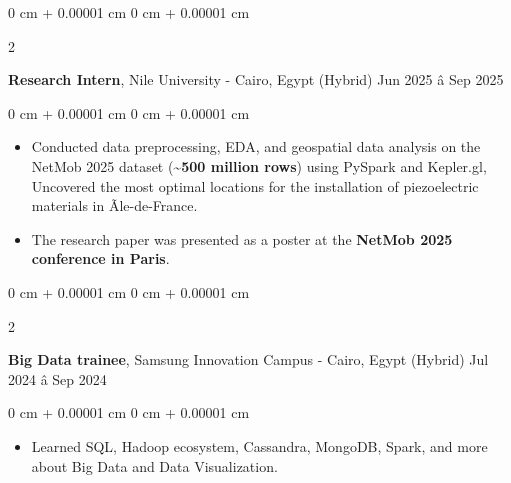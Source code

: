 \documentclass[9pt, letterpaper]{extarticle}
\newenvironment{highlights}{
    \begin{itemize}[
        topsep=0.06 cm,
        parsep=0.06 cm,
        partopsep=0pt,
        itemsep=0pt,
        leftmargin=0 cm + 10pt
    ]
}{
    \end{itemize}
} %
\newenvironment{onecolentry}{
    \begin{adjustwidth}{
        0 cm + 0.00001 cm
    }{
        0 cm + 0.00001 cm
    }
}{
    \end{adjustwidth}
} %
\newenvironment{twocolentry}[2][]{
    \onecolentry
    \def\secondColumn{#2}
    \setcolumnwidth{\fill, 4.5 cm}
    \begin{paracol}{2}
}{
    \switchcolumn \raggedleft \secondColumn
    \end{paracol}
    \endonecolentry
} %
\begin{document}
        \begin{twocolentry}{
            Jun 2025 â Sep 2025
        }
            \textbf{Research Intern}, Nile University - Cairo, Egypt (Hybrid) \end{twocolentry}

        \begin{onecolentry}
            \begin{highlights}
                \item Conducted data preprocessing, EDA, and geospatial data analysis on the NetMob 2025 dataset (\textbf{\textasciitilde500 million rows}) using PySpark and Kepler.gl, Uncovered the most optimal locations for the installation of piezoelectric materials in Ãle-de-France.
                \item The research paper was presented as a poster at the \textbf{NetMob 2025 conference in Paris}.
            \end{highlights}
        \end{onecolentry}

        
        \begin{twocolentry}{
            Jul 2024 â Sep 2024
        }
            \textbf{Big Data trainee}, Samsung Innovation Campus - Cairo, Egypt (Hybrid)\end{twocolentry}

        \begin{onecolentry}
            \begin{highlights}
                \item Learned SQL, Hadoop ecosystem, Cassandra, MongoDB, Spark, and more about Big Data and Data Visualization.
            \end{highlights}
        \end{onecolentry}

        

\end{document}
